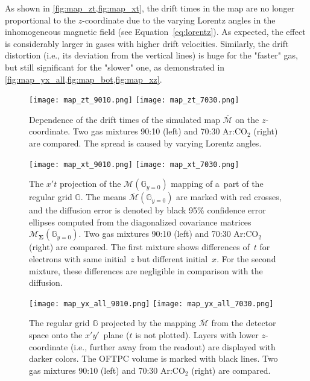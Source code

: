 		As shown in \cref{fig:map_zt,fig:map_xt}, the drift times in the map are no longer proportional to the $z$\nobreakdash-coordinate due to the varying Lorentz angles in the inhomogeneous magnetic field (see Equation~\ref{eq:lorentz}). As expected, the effect is considerably larger in gases with higher drift velocities. Similarly, the drift distortion (i.e., its deviation from the vertical lines) is huge for the "faster" gas, but still significant for the "slower" one, as demonstrated in \cref{fig:map_yx_all,fig:map_bot,fig:map_xz}.
		
		\begin{figure}
			\centering
			\texttt{[image: map\_zt\_9010.png]}
			\hfill
			\texttt{[image: map\_zt\_7030.png]}
			\caption{Dependence of the drift times of the simulated map $\overline{\mathcal{M}}$ on the $z$\protect\nobreakdash-coordinate. Two gas mixtures 90:10 (left) and 70:30 Ar:CO$_2$ (right) are compared. The spread is caused by varying Lorentz angles.}
			\label{fig:map_zt}
		\end{figure}
		
		\begin{figure}
			\centering
			\texttt{[image: map\_xt\_9010.png]}
			\hfill
			\texttt{[image: map\_xt\_7030.png]}
			\caption{The $x't$ projection of the $\mathcal{M}(\mathbb{G}_{y=0})$ mapping of a~part of the regular grid $\mathbb{G}$. The means $\overline{\mathcal{M}}(\mathbb{G}_{y=0})$ are marked with red crosses, and the diffusion error is denoted by black 95\% confidence error ellipses computed from the diagonalized covariance matrices $\mathcal{M}_{\mathbf{\Sigma}}(\mathbb{G}_{y=0})$. Two gas mixtures 90:10 (left) and 70:30 Ar:CO$_2$ (right) are compared. The first mixture shows differences of~$t$ for electrons with same initial~$z$ but different initial~$x$. For the second mixture, these differences are negligible in comparison with the diffusion.}
			\label{fig:map_xt}
		\end{figure}
		
		\begin{figure}
			\centering
			\texttt{[image: map\_yx\_all\_9010.png]}
			\hfill
			\texttt{[image: map\_yx\_all\_7030.png]}
			\caption{The regular grid $\mathbb{G}$ projected by the mapping $\overline{\mathcal{M}}$ from the detector space onto the $x'y'$~plane ($t$ is not plotted). Layers with lower $z$\protect\nobreakdash-coordinate (i.e., further away from the readout) are displayed with darker colors. The \ac{OFTPC} volume is marked with black lines. Two gas mixtures 90:10 (left) and 70:30 Ar:CO$_2$ (right) are compared.}
			\label{fig:map_yx_all}
		\end{figure}
		
